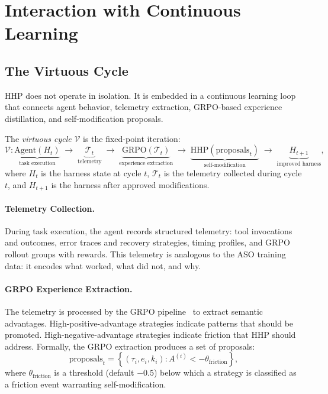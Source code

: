\section{Interaction with Continuous Learning}

\label{sec:cycle}

\subsection{The Virtuous Cycle}
\label{sec:virtuous}

HHP does not operate in isolation. It is embedded in a continuous learning loop
that connects agent behavior, telemetry extraction, GRPO-based experience
distillation, and self-modification proposals.

\begin{definition}
The \emph{virtuous cycle} $\mathcal{V}$ is the fixed-point iteration:
\begin{equation}
    \mathcal{V}: \underbrace{\text{Agent}(H_t)}_{\text{task execution}}
    \;\to\; \underbrace{\mathcal{T}_t}_{\text{telemetry}}
    \;\to\; \underbrace{\text{GRPO}(\mathcal{T}_t)}_{\text{experience extraction}}
    \;\to\; \underbrace{\text{HHP}(\text{proposals}_t)}_{\text{self-modification}}
    \;\to\; \underbrace{H_{t+1}}_{\text{improved harness}},
\end{equation}
where $H_t$ is the harness state at cycle $t$, $\mathcal{T}_t$ is the telemetry
collected during cycle $t$, and $H_{t+1}$ is the harness after approved
modifications.
\end{definition}

\paragraph{Telemetry Collection.}
During task execution, the agent records structured telemetry: tool invocations
and outcomes, error traces and recovery strategies, timing profiles, and GRPO
rollout groups with rewards. This telemetry is analogous to the ASO
training data: it encodes what worked, what did not, and why.

\paragraph{GRPO Experience Extraction.}
The telemetry is processed by the GRPO pipeline~\cite{hanzo2026aso} to extract
semantic advantages. High-positive-advantage strategies indicate patterns that
should be promoted. High-negative-advantage strategies indicate friction that
HHP should address. Formally, the GRPO extraction produces a set of proposals:
\begin{equation}
    \text{proposals}_t = \left\{(\tau_i, e_i, k_i) : A^{(i)} < -\theta_{\text{friction}}\right\},
\end{equation}
where $\theta_{\text{friction}}$ is a threshold (default $-0.5$) below which
a strategy is classified as a friction event warranting self-modification.

